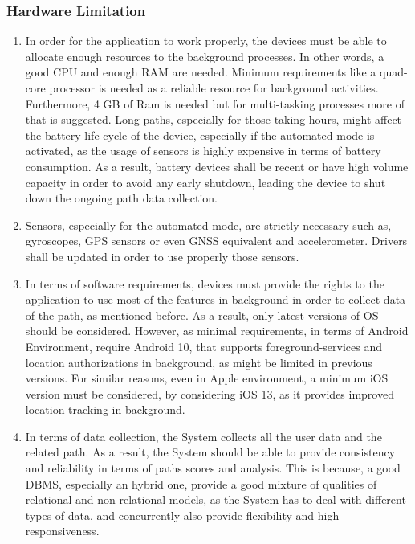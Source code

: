 \subsubsection{Hardware Limitation}
\begin{enumerate}
\item In order for the application to work properly, the devices must be able to allocate enough resources to the background processes. In other words, a good CPU and enough RAM are needed. Minimum requirements like a quad-core processor is needed as a reliable resource for background activities. Furthermore, 4 GB of Ram is needed but for multi-tasking processes more of that is suggested. Long paths, especially for those taking hours, might affect the battery life-cycle of the device, especially if the automated mode is activated, as the usage of sensors is highly expensive in terms of battery consumption. As a result, battery devices shall be recent or have high volume capacity in order to avoid any early shutdown, leading the device to shut down the ongoing path data collection. 
\item Sensors, especially for the automated mode, are strictly necessary such as, gyroscopes, GPS sensors or even GNSS equivalent and accelerometer. Drivers shall be updated in order to use properly those sensors. 
\item In terms of software requirements, devices must provide the rights to the application to use most of the features in background in order to collect data of the path, as mentioned before. As a result, only latest versions of OS should be considered. However, as minimal requirements, in terms of Android Environment, require Android 10, that supports foreground-services and location authorizations in background, as might be limited in previous versions. For similar reasons, even in Apple environment, a minimum iOS version must be considered, by considering iOS 13, as it provides improved location tracking in background.
\item In terms of data collection, the System collects all the user data and the related path. As a result, the System should be able to  provide consistency and reliability in terms of paths scores and analysis. This is because, a good DBMS, especially an hybrid one, provide a good mixture of qualities of relational and non-relational models, as the System has to deal with different types of data, and concurrently also provide flexibility and high responsiveness.
\end{enumerate}

